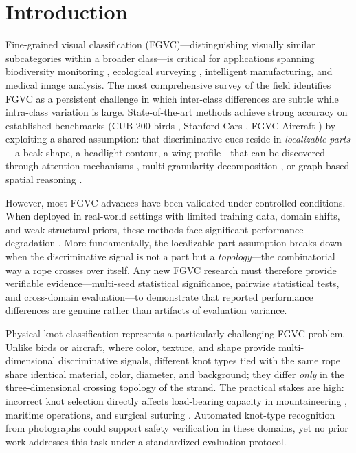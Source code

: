 \documentclass[preprint,review,12pt]{elsarticle}
\begin{document}
\linenumbers

\section{Introduction}
\label{sec:intro}

Fine-grained visual classification (FGVC)---distinguishing visually similar subcategories within a broader class---is critical for applications spanning biodiversity monitoring \citep{vanhorn2018inaturalist}, ecological surveying \citep{spiesman2021bumble}, intelligent manufacturing, and medical image analysis. The most comprehensive survey of the field \citep{wei2022fgia} identifies FGVC as a persistent challenge in which inter-class differences are subtle while intra-class variation is large. State-of-the-art methods achieve strong accuracy on established benchmarks (CUB-200 birds \citep{wah2011cub}, Stanford Cars \citep{krause2013}, FGVC-Aircraft \citep{maji2013fgvcaircraft}) by exploiting a shared assumption: that discriminative cues reside in \emph{localizable parts}---a beak shape, a headlight contour, a wing profile---that can be discovered through attention mechanisms \citep{he2022transfg}, multi-granularity decomposition \citep{du2020pmg}, or graph-based spatial reasoning \citep{zhuang2020apinet}.

However, most FGVC advances have been validated under controlled conditions. When deployed in real-world settings with limited training data, domain shifts, and weak structural priors, these methods face significant performance degradation \citep{zhou2022domain}. More fundamentally, the localizable-part assumption breaks down when the discriminative signal is not a part but a \emph{topology}---the combinatorial way a rope crosses over itself. Any new FGVC research must therefore provide verifiable evidence---multi-seed statistical significance, pairwise statistical tests, and cross-domain evaluation---to demonstrate that reported performance differences are genuine rather than artifacts of evaluation variance.

Physical knot classification represents a particularly challenging FGVC problem. Unlike birds or aircraft, where color, texture, and shape provide multi-dimensional discriminative signals, different knot types tied with the same rope share identical material, color, diameter, and background; they differ \emph{only} in the three-dimensional crossing topology of the strand. The practical stakes are high: incorrect knot selection directly affects load-bearing capacity in mountaineering \citep{adams2004, luebben2001}, maritime operations, and surgical suturing \citep{lam2022surgical}. Automated knot-type recognition from photographs could support safety verification in these domains, yet no prior work addresses this task under a standardized evaluation protocol.
\end{document}
